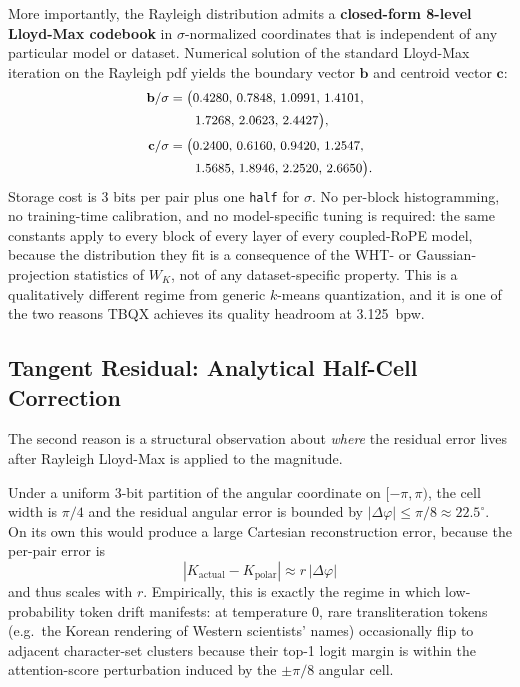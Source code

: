 \documentclass[10pt,twocolumn]{article}
\begin{document}
More importantly, the Rayleigh distribution admits a \textbf{closed-form 8-level Lloyd-Max codebook} in $\sigma$-normalized coordinates that is independent of any particular model or dataset. Numerical solution of the standard Lloyd-Max iteration on the Rayleigh pdf yields the boundary vector $\mathbf{b}$ and centroid vector $\mathbf{c}$:
\begin{equation}
\small
\begin{aligned}
\mathbf{b}/\sigma &= \bigl(0.4280,\,0.7848,\,1.0991,\,1.4101,\\
                  &\qquad 1.7268,\,2.0623,\,2.4427\bigr),\\[2pt]
\mathbf{c}/\sigma &= \bigl(0.2400,\,0.6160,\,0.9420,\,1.2547,\\
                  &\qquad 1.5685,\,1.8946,\,2.2520,\,2.6650\bigr).
\end{aligned}
\end{equation}
Storage cost is 3 bits per pair plus one \texttt{half} for $\sigma$. No per-block histogramming, no training-time calibration, and no model-specific tuning is required: the same constants apply to every block of every layer of every coupled-RoPE model, because the distribution they fit is a consequence of the WHT- or Gaussian-projection statistics of $W_K$, not of any dataset-specific property. This is a qualitatively different regime from generic $k$-means quantization, and it is one of the two reasons TBQX achieves its quality headroom at 3.125~bpw.

\subsection{Tangent Residual: Analytical Half-Cell Correction}
\label{sec:tangent}

The second reason is a structural observation about \emph{where} the residual error lives after Rayleigh Lloyd-Max is applied to the magnitude.

Under a uniform 3-bit partition of the angular coordinate on $[-\pi,\pi)$, the cell width is $\pi/4$ and the residual angular error is bounded by $|\Delta\varphi| \le \pi/8 \approx 22.5^\circ$. On its own this would produce a large Cartesian reconstruction error, because the per-pair error is
\begin{equation}
|K_{\text{actual}} - K_{\text{polar}}| \approx r\,|\Delta\varphi|
\end{equation}
and thus scales with $r$. Empirically, this is exactly the regime in which low-probability token drift manifests: at temperature $0$, rare transliteration tokens (e.g.\ the Korean rendering of Western scientists' names) occasionally flip to adjacent character-set clusters because their top-1 logit margin is within the attention-score perturbation induced by the $\pm\pi/8$ angular cell.
\end{document}
